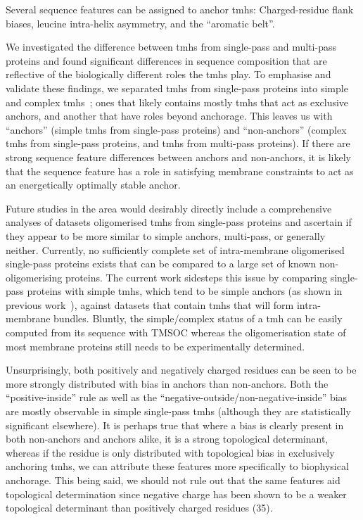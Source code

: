 Several sequence features can be assigned to anchor \gls{tmh}s: Charged-residue flank biases, leucine intra-helix asymmetry, and the ``aromatic belt''.

We investigated the difference between \gls{tmh}s from single-pass and multi-pass proteins and found significant differences in sequence composition that are reflective of the biologically different roles the \gls{tmh}s play. To emphasise and validate these findings, we separated \gls{tmh}s from single-pass proteins into simple and complex \gls{tmh}s~\cite{Wong2011, Wong2012}; ones that likely contains mostly \gls{tmh}s that act as exclusive anchors, and another that have roles beyond anchorage. This leaves us with ``anchors'' (simple \gls{tmh}s from single-pass proteins) and ``non-anchors'' (complex \gls{tmh}s from single-pass proteins, and \gls{tmh}s from multi-pass proteins). If there are strong sequence feature differences between anchors and non-anchors, it is likely that the sequence feature has a role in satisfying membrane constraints to act as an energetically optimally stable anchor.

Future studies in the area would desirably directly include a comprehensive analyses of datasets oligomerised \gls{tmh}s from single-pass proteins and ascertain if they appear to be more similar to simple anchors, multi-pass, or generally neither. Currently, no sufficiently complete set of intra-membrane oligomerised single-pass proteins exists that can be compared to a large set of known non-oligomerising proteins. The current work sidesteps this issue by comparing single-pass proteins with simple \gls{tmh}s, which tend to be simple anchors (as shown in previous work~\cite{Wong2011, Wong2012}), against datasets that contain \gls{tmh}s that will form intra-membrane bundles. Bluntly, the simple/complex status of a \gls{tmh} can be easily computed from its sequence with TMSOC whereas the oligomerisation state of most membrane proteins still needs to be experimentally determined.

Unsurprisingly, both positively and negatively charged residues can be seen to be more strongly distributed with bias in anchors than non-anchors. Both the ``positive-inside'' rule as well as the ``negative-outside/non-negative-inside'' bias are mostly observable in simple single-pass \gls{tmh}s (although they are statistically significant elsewhere). It is perhaps true that where a bias is clearly present in both non-anchors and anchors alike, it is a strong topological determinant, whereas if the residue is only distributed with topological bias in exclusively anchoring \gls{tmh}s, we can attribute these features more specifically to biophysical anchorage. This being said, we should not rule out that the same features aid topological determination since negative charge has been shown to be a weaker topological determinant than positively charged residues (35).

